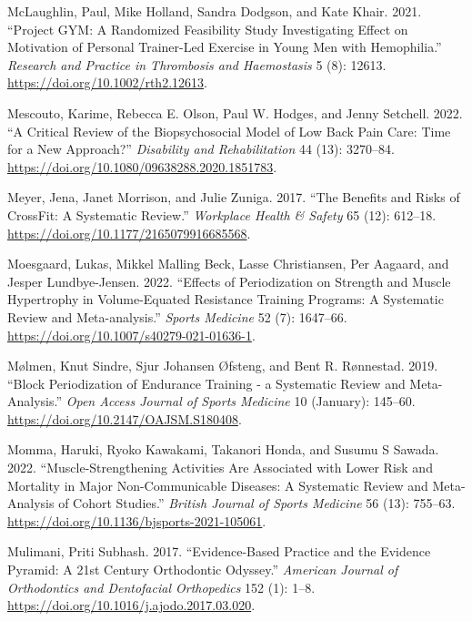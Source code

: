 \documentclass[
  letterpaper,
  DIV=11,
  numbers=noendperiod]{scrreprt}
\newlength{\cslhangindent}
\newenvironment{CSLReferences}[2] %
 {\begin{list}{}{%
  \setlength{\itemindent}{0pt}
  \setlength{\leftmargin}{0pt}
  \setlength{\parsep}{0pt}
  \ifodd #1
   \setlength{\leftmargin}{\cslhangindent}
   \setlength{\itemindent}{-1\cslhangindent}
  \fi
  \setlength{\itemsep}{#2\baselineskip}}}
 {\end{list}}
\begin{document}
\begin{CSLReferences}{1}{0}
McLaughlin, Paul, Mike Holland, Sandra Dodgson, and Kate Khair. 2021.
{``Project {GYM}: {A} Randomized Feasibility Study Investigating Effect
on Motivation of Personal Trainer-Led Exercise in Young Men with
Hemophilia.''} \emph{Research and Practice in Thrombosis and
Haemostasis} 5 (8): 12613. \url{https://doi.org/10.1002/rth2.12613}.

Mescouto, Karime, Rebecca E. Olson, Paul W. Hodges, and Jenny Setchell.
2022. {``A Critical Review of the Biopsychosocial Model of Low Back Pain
Care: Time for a New Approach?''} \emph{Disability and Rehabilitation}
44 (13): 3270--84. \url{https://doi.org/10.1080/09638288.2020.1851783}.

Meyer, Jena, Janet Morrison, and Julie Zuniga. 2017. {``The {Benefits}
and {Risks} of {CrossFit}: {A Systematic Review}.''} \emph{Workplace
Health \& Safety} 65 (12): 612--18.
\url{https://doi.org/10.1177/2165079916685568}.

Moesgaard, Lukas, Mikkel Malling Beck, Lasse Christiansen, Per Aagaard,
and Jesper Lundbye-Jensen. 2022. {``Effects of {Periodization} on
{Strength} and {Muscle Hypertrophy} in {Volume-Equated Resistance
Training Programs}: {A Systematic Review} and {Meta-analysis}.''}
\emph{Sports Medicine} 52 (7): 1647--66.
\url{https://doi.org/10.1007/s40279-021-01636-1}.

Mølmen, Knut Sindre, Sjur Johansen Øfsteng, and Bent R. Rønnestad. 2019.
{``Block Periodization of Endurance Training - a Systematic Review and
Meta-Analysis.''} \emph{Open Access Journal of Sports Medicine} 10
(January): 145--60. \url{https://doi.org/10.2147/OAJSM.S180408}.

Momma, Haruki, Ryoko Kawakami, Takanori Honda, and Susumu S Sawada.
2022. {``Muscle-Strengthening Activities Are Associated with Lower Risk
and Mortality in Major Non-Communicable Diseases: A Systematic Review
and Meta-Analysis of Cohort Studies.''} \emph{British Journal of Sports
Medicine} 56 (13): 755--63.
\url{https://doi.org/10.1136/bjsports-2021-105061}.

Mulimani, Priti Subhash. 2017. {``Evidence-Based Practice and the
Evidence Pyramid: {A} 21st Century Orthodontic Odyssey.''}
\emph{American Journal of Orthodontics and Dentofacial Orthopedics} 152
(1): 1--8. \url{https://doi.org/10.1016/j.ajodo.2017.03.020}.


\end{CSLReferences}
\end{document}
